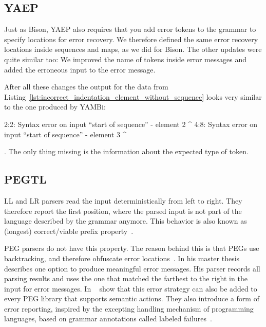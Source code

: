 \subsection{YAEP}

Just as Bison, YAEP also requires that you add error tokens to the grammar to specify locations for error recovery. We therefore defined the same error recovery locations inside sequences and maps, as we did for Bison. The other updates were quite similar too: We improved the name of tokens inside error messages and added the erroneous input to the error message.

After all these changes the output for the  data from Listing~\ref{lst:incorrect_indentation_element_without_sequence} looks very similar to the one produced by YAMBi:

\begin{textcode}
2:2: Syntax error on input “start of sequence”
      - element 2
      ^
4:8: Syntax error on input “start of sequence”
            - element 3
            ^
\end{textcode}

. The only thing missing is the information about the expected type of token.

\subsection{PEGTL}

LL and LR parsers read the input deterministically from left to right. They therefore report the first position, where the parsed input is not part of the language described by the grammar anymore. This behavior is also known as (longest) correct/viable prefix property~\cite{sippu1990parsing, ruefenacht2016error, maidl2016labeled, pottier2016reachability}.

\Gls{PEG} parsers do not have this property. The reason behind this is that \glspl{PEG} use backtracking, and therefore obfuscate error locations~\cite{ruefenacht2016error}. In his master thesis~\cite{ford2002packrat} \citeauthor{ford2002packrat} describes one option to produce meaningful error messages. His parser records all parsing results and uses the one that matched the farthest to the right in the input for error messages. In ~\cite{maidl2016labeled} \citeauthor{maidl2016labeled} show that this error strategy can also be added to every \gls{PEG} library that supports semantic actions. They also introduce a form of error reporting, inspired by the excepting handling mechanism of programming languages, based on grammar annotations called labeled failures~\cite{maidl2016labeled}.

